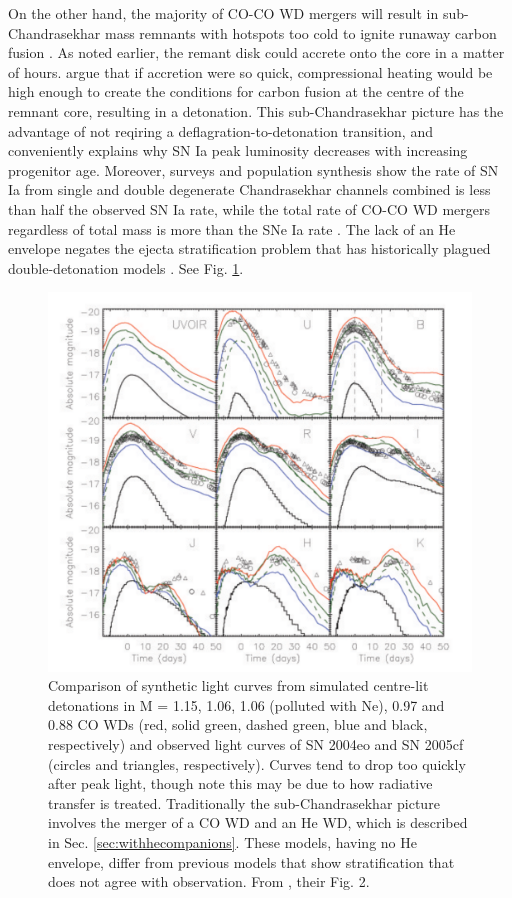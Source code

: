 On the other hand, the majority of CO-CO WD mergers will result in sub-Chandrasekhar mass remnants with hotspots too cold to ignite runaway carbon fusion \citep{vkercj10,loreig09}.  As noted earlier, the remant disk could accrete onto the core in a matter of hours.  \citeauthor{vkercj10} argue that if accretion were so quick, compressional heating would be high enough to create the conditions for carbon fusion at the centre of the remnant core, resulting in a detonation.  This sub-Chandrasekhar picture has the advantage of not reqiring a deflagration-to-detonation transition, and conveniently explains why SN Ia peak luminosity decreases with increasing progenitor age.  Moreover, surveys and population synthesis show the rate of SN Ia from single and double degenerate Chandrasekhar channels combined is less than half the observed SN Ia rate, while the total rate of CO-CO WD mergers regardless of total mass is more than the SNe Ia rate \citep{vkercj10,sim+10}.  The lack of an He envelope negates the ejecta stratification problem that has historically plagued double-detonation models \citep{vkercj10,howe10,sim+10}.  See Fig. \ref{simfig}.

\begin{figure}
\centerline{\includegraphics[width=0.8\hsize]{simfig.pdf}}
\caption{Comparison of synthetic light curves from simulated centre-lit detonations in M = 1.15, 1.06, 1.06 (polluted with Ne), 0.97 and 0.88 {\Msun} CO WDs (red, solid green, dashed green, blue and black, respectively) and observed light curves of SN 2004eo and SN 2005cf (circles and triangles, respectively).  Curves tend to drop too quickly after peak light, though \cite{sim+10} note this may be due to how radiative transfer is treated.  Traditionally the sub-Chandrasekhar picture involves the merger of a CO WD and an He WD, which is described in Sec. \ref{sec:withhecompanions}.  These models, having no He envelope, differ from previous models that show {\Ni} stratification that does not agree with observation.  From \cite{sim+10}, their Fig. 2.}
\label{simfig}
\end{figure}

